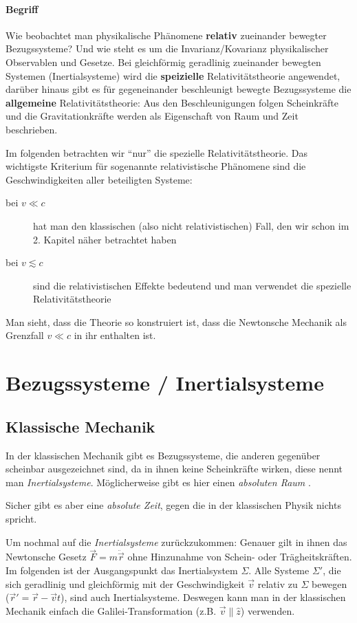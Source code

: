 \documentclass[oneside]{book}
\theoremstyle{definition}
\newcommand{\ddotvec}[1]{\ddot{\vec{#1}}}
\begin{document}
\paragraph{Begriff} Wie beobachtet man physikalische Phänomene \textbf{relativ} zueinander bewegter Bezugssysteme? Und wie steht es um die Invarianz/Kovarianz physikalischer Observablen und Gesetze.
Bei gleichförmig geradlinig zueinander bewegten Systemen (Inertialsysteme) wird die \textbf{speizielle} Relativitätstheorie angewendet, darüber hinaus gibt es für gegeneinander beschleunigt bewegte Bezugssysteme die \textbf{allgemeine} Relativitätstheorie: Aus den Beschleunigungen folgen Scheinkräfte und die Gravitationkräfte werden als Eigenschaft von Raum und Zeit beschrieben.

Im folgenden betrachten wir "`nur"' die spezielle Relativitätstheorie.
Das wichtigste Kriterium für sogenannte relativistische Phänomene sind die Geschwindigkeiten aller beteiligten Systeme:
\begin{description}
	\item[bei $v \ll c$] hat man den klassischen (also nicht relativistischen) Fall, den wir schon im 2. Kapitel näher betrachtet haben
	\item[bei $v \lesssim c $] sind die relativistischen Effekte bedeutend und man verwendet die spezielle Relativitätstheorie
\end{description}
Man sieht, dass die Theorie so konstruiert ist, dass die Newtonsche Mechanik als Grenzfall $v \ll c$ in ihr enthalten ist.

\section{Bezugssysteme / Inertialsysteme}
\subsection{Klassische Mechanik}
In der klassischen Mechanik gibt es Bezugssysteme, die anderen gegenüber scheinbar ausgezeichnet sind, da in ihnen keine Scheinkräfte wirken, diese nennt man \textit{Inertialsysteme}. Möglicherweise gibt es hier einen \textit{absoluten Raum} .

Sicher gibt es aber eine \textit{absolute Zeit}, gegen die in der klassischen Physik nichts spricht.

Um nochmal auf die \textit{Inertialsysteme} zurückzukommen: Genauer gilt in ihnen das Newtonsche Gesetz $\vec{F} = m \ddotvec{r}$ ohne Hinzunahme von Schein- oder Trägheitskräften. Im folgenden ist der Ausgangspunkt das Inertialsystem $\Sigma$.
Alle Systeme $\Sigma'$, die sich geradlinig und gleichförmig mit der Geschwindigkeit $\vec v$ relativ zu $\Sigma$ bewegen ($\vec{r}' = \vec{r} - \vec{v}t$), sind auch Inertialsysteme. Deswegen kann man in der klassischen Mechanik einfach die Galilei-Transformation (z.B. $\vec{v} \parallel \hat{z}$) verwenden.
\end{document}
